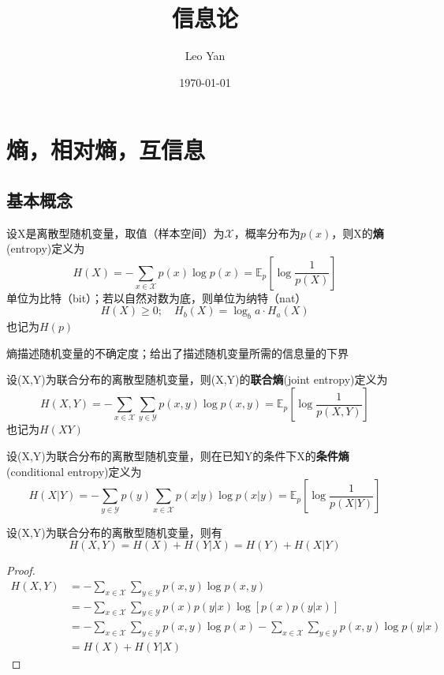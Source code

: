 \documentclass{ctexbook}
\title{信息论}
\author{Leo Yan}
\date{\today}
\begin{document}
\maketitle
\tableofcontents
\clearpage
\chapter{熵，相对熵，互信息}

\section{基本概念}

\begin{definition}[熵]
    设X是离散型随机变量，取值（样本空间）为$\mathcal{X}$，概率分布为$p(x)$，则X的\textbf{熵}(entropy)定义为
    \[H(X) = -\sum_{x \in \mathcal{X}} p(x) \log p(x)=\mathbb{E} _p\left[\log \frac{1}{p(X)}\right]\]
    单位为比特（bit）；若以自然对数为底，则单位为纳特（nat）
    \[H(X)\geq 0;\quad H_b(X)=\log_b a\cdot H_a(X)\]
    也记为$H(p)$
\end{definition}
\begin{remark}
    熵描述随机变量的不确定度；给出了描述随机变量所需的信息量的下界
\end{remark}

\begin{definition}[联合熵]
    设(X,Y)为联合分布的离散型随机变量，则(X,Y)的\textbf{联合熵}(joint entropy)定义为
    \[H(X,Y) = -\sum_{x \in \mathcal{X}} \sum_{y \in \mathcal{Y}} p(x,y) \log p(x,y)=\mathbb{E} _p\left[\log \frac{1}{p(X,Y)}\right]\]
    也记为$H(XY)$
\end{definition}

\begin{definition}[条件熵]
    设(X,Y)为联合分布的离散型随机变量，则在已知Y的条件下X的\textbf{条件熵}(conditional entropy)定义为
    \[H(X|Y) = -\sum_{y \in \mathcal{Y}} p(y) \sum_{x \in \mathcal{X}} p(x|y) \log p(x|y)=\mathbb{E} _p\left[\log \frac{1}{p(X|Y)}\right]\]
\end{definition}

\begin{theorem}[链式法则]
    设(X,Y)为联合分布的离散型随机变量，则有
    \[H(X,Y) = H(X) + H(Y|X) = H(Y) + H(X|Y)\]
\end{theorem}
\begin{proof}
    \begin{align*}
        H(X,Y) &= -\sum_{x \in \mathcal{X}} \sum_{y \in \mathcal{Y}} p(x,y) \log p(x,y) \\
        &= -\sum_{x \in \mathcal{X}} \sum_{y \in \mathcal{Y}} p(x)p(y|x) \log [p(x)p(y|x)] \\
        &= -\sum_{x \in \mathcal{X}} \sum_{y \in \mathcal{Y}} p(x,y) \log p(x) - \sum_{x \in \mathcal{X}} \sum_{y \in \mathcal{Y}} p(x,y) \log p(y|x) \\
        &= H(X) + H(Y|X)
    \end{align*}
\end{proof}
\end{document}
